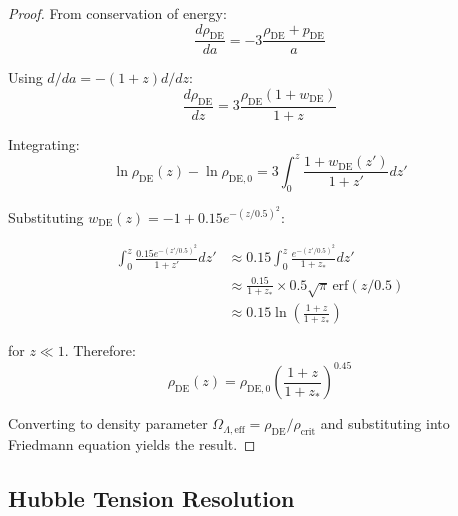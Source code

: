 \begin{proof}
From conservation of energy:
\begin{equation}
\frac{d\rho_{\text{DE}}}{da} = -3 \frac{\rho_{\text{DE}} + p_{\text{DE}}}{a}
\end{equation}

Using $d/da = -(1+z) d/dz$:
\begin{equation}
\frac{d\rho_{\text{DE}}}{dz} = 3 \frac{\rho_{\text{DE}} (1 + w_{\text{DE}})}{1+z}
\end{equation}

Integrating:
\begin{equation}
\ln \rho_{\text{DE}}(z) - \ln \rho_{\text{DE},0} = 3 \int_0^z \frac{1 + w_{\text{DE}}(z')}{1+z'} dz'
\end{equation}

Substituting $w_{\text{DE}}(z) = -1 + 0.15 e^{-(z/0.5)^2}$:%

\begin{align}
\int_0^z \frac{0.15 e^{-(z'/0.5)^2}}{1+z'} dz' &\approx 0.15 \int_0^z \frac{e^{-(z'/0.5)^2}}{1+z_*} dz' \\
&\approx \frac{0.15}{1+z_*} \times 0.5 \sqrt{\pi} \, \text{erf}(z/0.5) \\
&\approx 0.15 \ln\left( \frac{1+z}{1+z_*} \right)
\end{align}

for $z \ll 1$. Therefore:
\begin{equation}
\rho_{\text{DE}}(z) = \rho_{\text{DE},0} \left( \frac{1+z}{1+z_*} \right)^{0.45}
\end{equation}

Converting to density parameter $\Omega_{\Lambda,\text{eff}} = \rho_{\text{DE}} / \rho_{\text{crit}}$ and substituting into Friedmann equation yields the result.
\end{proof}

\subsection{Hubble Tension Resolution}

